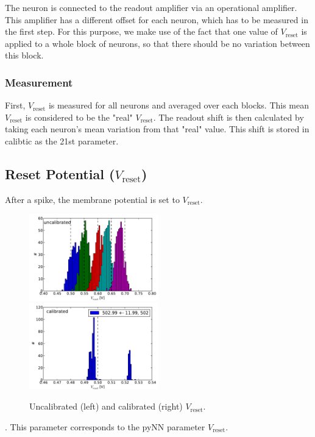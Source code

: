 \documentclass[12pt,a4paper,bibliography=totocnumbered,listof=totocnumbered, DIV12]{scrartcl}
\newcommand{\vreset}{\ensuremath{V_{\text{reset}}}}
\begin{document}
The neuron is connected to the readout amplifier via an operational amplifier.
This amplifier has a different offset for each neuron, which has to be measured in the first step.
For this purpose, we make use of the fact that one value of $V_\text{reset}$ is applied to a whole block of neurons, so that there should be no variation between this block.

\subsubsection*{Measurement}

First, $V_\text{reset}$ is measured for all neurons and averaged over each blocks.
This mean $V_\text{reset}$ is considered to be the "real" $V_\text{reset}$.
The readout shift is then calculated by taking each neuron's mean variation from that "real" value.
This shift is stored in calibtic as the 21st parameter.

\subsection{Reset Potential (\vreset)}



After a spike, the membrane potential is set to \vreset.
\begin{figure}
  \centering
  \includegraphics[width=0.5\textwidth]{figures/V_reset_uncalibrated}%
  \includegraphics[width=0.5\textwidth]{figures/V_reset_calibrated}
  \caption{Uncalibrated (left) and calibrated (right) \vreset.}
  \label{fig:vreset_uncalib_calib}
\end{figure}
.
This parameter corresponds to the pyNN parameter \vreset.
\end{document}

